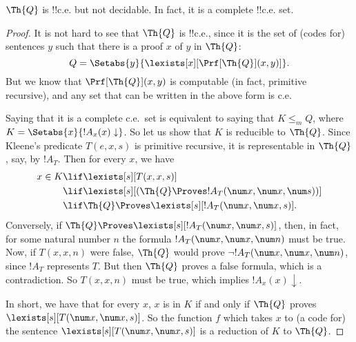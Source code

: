 \documentclass[../../../include/open-logic-section]{subfiles}
\begin{document}

\begin{thm}
$\Th{Q}$ is !!{c.e.} but not decidable. In fact, it is a complete
  !!{c.e.} set.
\end{thm}

\begin{proof}
It is not hard to see that $\Th{Q}$ is !!{c.e.}, since it is the set of
(codes for) sentences $y$ such that there is a proof $x$ of $y$ in
$\Th{Q}$:
\[
Q = \Setabs{y}{\lexists[x][\Prf[\Th{Q}](x,y)]}.
\]
But we know that $\Prf[\Th{Q}](x,y)$ is computable (in fact, primitive
recursive), and any set that can be written in the above form is c.e.

Saying that it is a complete c.e.\ set is equivalent to saying that $K
\leq_m Q$, where $K = \Setabs{x}{!A_x(x) \downarrow}$. So let us show
that $K$ is reducible to $\Th{Q}$. Since Kleene's predicate $T(e,x,s)$ is
primitive recursive, it is representable in $\Th{Q}$, say, by $!A_T$. Then
for every $x$, we have
\begin{align*}
x \in K & \lif \lexists[s][T(x,x,s)] \\
& \lif \lexists[s][(\Th{Q} \Proves !A_T(\num x,\num x, \num s))]
  \\
& \lif \Th{Q} \Proves \lexists[s][!A_T(\num x, \num x, s)].
\end{align*}
Conversely, if $\Th{Q} \Proves \lexists[s][!A_T(\num x, \num x, s)]$,
then, in fact, for some natural number $n$ the formula $!A_T(\num x,
\num x, \num n)$ must be true.  Now, if $T(x,x,n)$ were false,
$\Th{Q}$ would prove $\lnot !A_T(\num x, \num x, \num n)$, since
$!A_T$ represents $T$.  But then $\Th{Q}$ proves a false formula,
which is a contradiction. So $T(x,x,n)$ must be true, which implies
$!A_x(x) \downarrow$.

In short, we have that for every $x$, $x$ is in $K$ if and only if
$\Th{Q}$ proves $\lexists[s][T(\num x,\num x,s)]$. So the function $f$
which takes $x$ to (a code for) the sentence $\lexists[s][T(\num x,
  \num x, s)]$ is a reduction of $K$ to $\Th{Q}$.
\end{proof}
\end{document}
